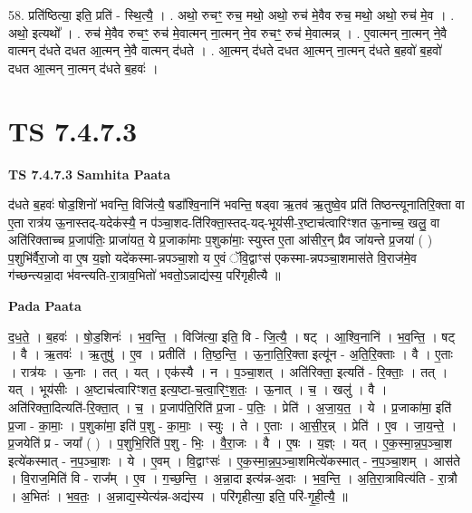\documentclass[17pt]{extarticle}
\begin{document}
58. प्रति॑ष्ठित्या॒ इति॒ प्रति॑ - स्थि॒त्यै॒ । . अथो॒ रुचꣳ॒॒ रुच॒ मथो॒ अथो॒ रुच॑ मे॒वैव रुच॒ मथो॒ अथो॒ रुच॑ मे॒व । . अथो॒ इत्यथो᳚ । . रुच॑ मे॒वैव रुचꣳ॒॒ रुच॑ मे॒वात्मन् ना॒त्मन् ने॒व रुचꣳ॒॒ रुच॑ मे॒वात्मन्न् । . ए॒वात्मन् ना॒त्मन् ने॒वै वात्मन् द॑धते दधत आ॒त्मन् ने॒वै वात्मन् द॑धते । . आ॒त्मन् द॑धते दधत आ॒त्मन् ना॒त्मन् द॑धते ब॒हवो॑ ब॒हवो॑ दधत आ॒त्मन् ना॒त्मन् द॑धते ब॒हवः॑ । \newline
\pagebreak
{}

\section{ TS 7.4.7.3 }

\textbf{TS 7.4.7.3 } \newline
\textbf{Samhita Paata} \newline

द॑धते ब॒हवः॑ षोड॒शिनो॑ भवन्ति॒ विजि॑त्यै॒ षडा᳚श्वि॒नानि॑ भवन्ति॒ षड्वा ऋ॒तव॑ ऋ॒तुष्वे॒व प्रति॑ तिष्ठन्त्यूनातिरि॒क्ता वा ए॒ता रात्र॑य ऊ॒नास्तद्-यदेक॑स्यै॒ न प॑ञ्चा॒शद-ति॑रिक्ता॒स्तद्-यद्-भूय॑सी-र॒ष्टाच॑त्वारिꣳशत ऊ॒नाच्च॒ खलु॒ वा अति॑रिक्ताच्च प्र॒जाप॑तिः॒ प्राजा॑यत॒ ये प्र॒जाका॑माः प॒शुका॑माः॒ स्युस्त ए॒ता आ॑सीर॒न् प्रैव जा॑यन्ते प्र॒जया॑ ( ) प॒शुभि॑र्वैरा॒जो वा ए॒ष य॒ज्ञो यदे॑कस्मा-न्नपञ्चा॒शो य ए॒वं ॅवि॒द्वाꣳस॑ एकस्मा-न्नपञ्चा॒शमास॑ते वि॒राज॑मे॒व ग॑च्छन्त्यन्ना॒दा भ॑वन्त्यति-रा॒त्राव॒भितो॑ भवतो॒ऽन्नाद्य॑स्य॒ परि॑गृहीत्यै ॥ \newline

\textbf{Pada Paata} \newline

द॒ध॒ते॒ । ब॒हवः॑ । षो॒ड॒शिनः॑ । भ॒व॒न्ति॒ । विजि॑त्या॒ इति॒ वि - जि॒त्यै॒ । षट् । आ॒श्वि॒नानि॑ । भ॒व॒न्ति॒ । षट् । वै । ऋ॒तवः॑ । ऋ॒तुषु॑ । ए॒व । प्रतीति॑ । ति॒ष्ठ॒न्ति॒ । ऊ॒ना॒ति॒रि॒क्ता इत्यू॑न - अ॒ति॒रि॒क्ताः । वै । ए॒ताः । रात्र॑यः । ऊ॒नाः । तत् । यत् । एक॑स्यै । न । प॒ञ्चा॒शत् । अति॑रिक्ता॒ इत्यति॑ - रि॒क्ताः॒ । तत् । यत् । भूय॑सीः । अ॒ष्टाच॑त्वारिꣳशत॒ इत्य॒ष्टा-च॒त्वा॒रिꣳ॒॒श॒तः॒ । ऊ॒नात् । च॒ । खलु॑ । वै । अति॑रिक्ता॒दित्यति॑-रि॒क्ता॒त् । च॒ । प्र॒जाप॑ति॒रिति॑ प्र॒जा - प॒तिः॒ । प्रेति॑ । अ॒जा॒य॒त॒ । ये । प्र॒जाका॑मा॒ इति॑ प्र॒जा - का॒माः॒ । प॒शुका॑मा॒ इति॑ प॒शु - का॒माः॒ । स्युः । ते । ए॒ताः । आ॒सी॒र॒न्न् । प्रेति॑ । ए॒व । जा॒य॒न्ते॒ । प्र॒जयेति॑ प्र - जया᳚ ( ) । प॒शुभि॒रिति॑ प॒शु - भिः॒ । वै॒रा॒जः । वै । ए॒षः । य॒ज्ञ्ः । यत् । ए॒क॒स्मा॒न्न॒प॒ञ्चा॒श इत्ये॑कस्मात् - न॒प॒ञ्चा॒शः । ये । ए॒वम् । वि॒द्वाꣳसः॑ । ए॒क॒स्मा॒न्न॒प॒ञ्चा॒शमित्ये॑कस्मात् - न॒प॒ञ्चा॒शम् । आस॑ते । वि॒राज॒मिति॑ वि - राज᳚म् । ए॒व । ग॒च्छ॒न्ति॒ । अ॒न्ना॒दा इत्य॑न्न-अ॒दाः । भ॒व॒न्ति॒ । अ॒ति॒रा॒त्रावित्य॑ति - रा॒त्रौ । अ॒भितः॑ । भ॒व॒तः॒ । अ॒न्नाद्य॒स्येत्य॑न्न-अद्य॑स्य । परि॑गृहीत्या॒ इति॒ परि॑-गृ॒ही॒त्यै॒ ॥  \newline
\end{document}
